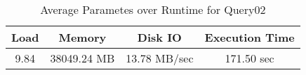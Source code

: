 \documentclass[../../main.tex]{subfiles}
\begin{document}
    \begin{table}
        \begin{center}
            \begin{tabular}{ |c|c|c|c| } 
            \hline
            Load & Memory & Disk IO & Execution Time\\
            \hline
            9.84 & 38049.24 MB & 13.78 MB/sec & 171.50 sec \\
            \hline
            \end{tabular}
            \\[1pt]
            \caption{Average Parametes over Runtime for Query02}
        \end{center}
    \end{table}
    \pagebreak
\end{document}
